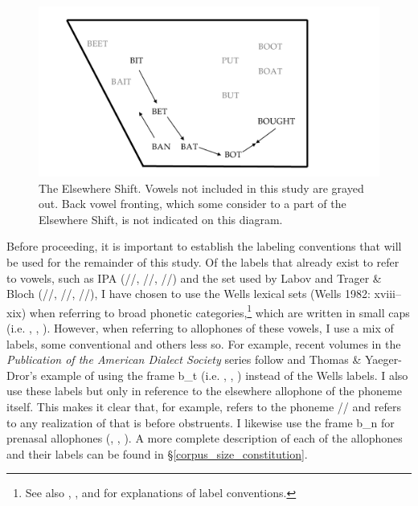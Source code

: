 \begin{figure}[tb!]
    \centering
    \includegraphics[width = 6.5in]{Figures/other_figures/cvs_diagram.pdf}
    \caption[The Elsewhere Shift]{The Elsewhere Shift. Vowels not included in this study are grayed out. Back vowel fronting, which some consider to a part of the Elsewhere Shift, is not indicated on this diagram.}
    \label{fig:elsewhere_shift_diagram}
\end{figure}

Before proceeding, it is important to establish the labeling conventions that will be used for the remainder of this study. Of the labels that already exist to refer to vowels, such as IPA (/\textipa{\ae}/, //, //) and the set used by Labov and Trager \& Bloch (/\textipa{\ae}/, //, //), I have chosen to use the Wells lexical sets (Wells 1982: xviii–xix) when referring to broad phonetic categories,\footnote{See also \citet[43]{kennedy_grama_2012}, \citet{fruehwald_2018}, and \citet{stanley_2019_blog} for explanations of label conventions.} which are written in {\sc small caps} (i.e. \trap, \dress, \kit). However, when referring to allophones of these vowels, I use a mix of labels, some conventional and others less so. For example, recent volumes in the \textit{Publication of the American Dialect Society} series follow \citet{eckert_2008} and Thomas \& Yaeger-Dror's \citeyearpar{thomas_yaegerdror_2009} example of using the frame {\sc b\_t} (i.e. \bat, \bet, \bit) instead of the Wells labels. I also use these labels but only in reference to the elsewhere allophone of the phoneme itself. This makes it clear that, for example, \kit refers to the phoneme // and \bit refers to any realization of \kit that is before obstruents. I likewise use the frame {\sc b\_n} for prenasal allophones (\ban, \ben, \bin). A more complete description of each of the allophones and their labels can be found in \S\ref{corpus_size_constitution}.




